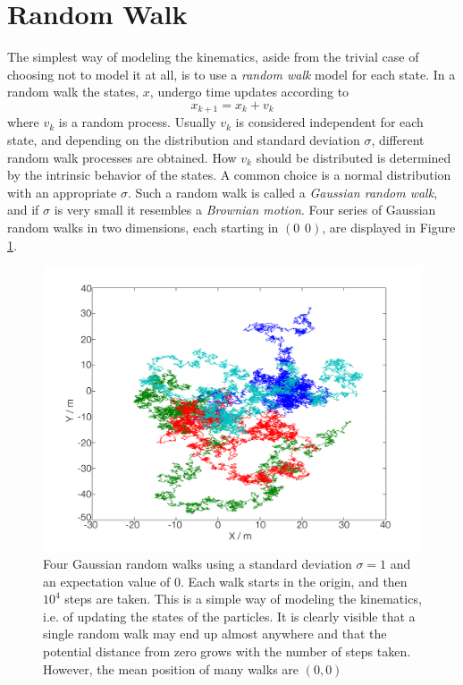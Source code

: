 \documentclass{LTHthesis}
\begin{document}
\section{Random Walk}
%
The simplest way of modeling the kinematics, aside from the trivial case of choosing not to model it at all, is to use a \emph{random walk} model for each state. In a random walk the states, $x$, undergo time updates according to
%
\begin{equation}
x_{k+1} = x_k + v_k
\end{equation}      
%
where $v_k$ is a random process. Usually $v_k$ is considered independent for each state, and depending on the distribution and standard deviation $\sigma$, different random walk processes are obtained. How $v_k$ should be distributed is determined by the intrinsic behavior of the states. A common choice is a normal distribution with an appropriate $\sigma$. Such a random walk is called a \emph{Gaussian random walk}, and if $\sigma$ is very small it resembles a \emph{Brownian motion}. Four series of Gaussian random walks in two dimensions, each starting in $(0\hspace{5pt}0)$, are displayed in Figure \ref{rand_walk}. 
%
\begin{figure}[!hbt]

\includegraphics[width=1\textwidth ]{images/kinematic/rand_walk}
\caption{Four Gaussian random walks using a standard deviation $\sigma = 1$ and an expectation value of 0. Each walk starts in the origin, and then $10^4$ steps are taken. This is a simple way of modeling the kinematics, i.e. of updating the states of the particles. It is clearly visible that a single random walk may end up almost anywhere and that the potential distance from zero grows with the number of steps taken. However, the mean position of many walks are $(0,0)$}\label{rand_walk}
\end{figure}
%
\end{document}

